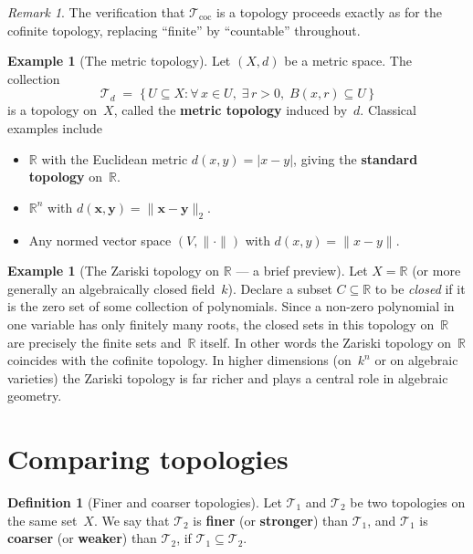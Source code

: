 \documentclass[11pt,a4paper,twoside]{book}
\theoremstyle{remark}
\newtheorem{remark}[theorem]{Remark}
\theoremstyle{definition}
\newtheorem{exampleplain}[theorem]{Example}
\theoremstyle{definition}
\newtheorem{definition}{Definition}[section]
\newcommand{\Tau}{\mathcal{T}}           %
\newcommand{\R}{\mathbb{R}}
\begin{document}
\begin{remark}
The verification that $\Tau_{\mathrm{coc}}$ is a topology proceeds exactly as
for the cofinite topology, replacing ``finite'' by ``countable'' throughout.
\end{remark}

\begin{exampleplain}[The metric topology]\label{ex:metric-topology}
Let $(X,d)$ be a metric space.  The collection
\[
  \Tau_d \;=\; \{\, U\subseteq X : \forall\, x\in U,\;\exists\, r>0,\;
                  B(x,r)\subseteq U\,\}
\]
is a topology on~$X$, called the \textbf{metric topology} induced by~$d$.
Classical examples include
\begin{itemize}
  \item $\R$ with the Euclidean metric $d(x,y)=|x-y|$, giving the
        \textbf{standard topology}\index{standard topology on $\R$} on~$\R$.
  \item $\R^n$ with $d(\mathbf{x},\mathbf{y})=\|\mathbf{x}-\mathbf{y}\|_2$.
  \item Any normed vector space $(V,\|\cdot\|)$ with $d(x,y)=\|x-y\|$.
\end{itemize}
\end{exampleplain}

\begin{exampleplain}[The Zariski topology on $\R$ --- a brief preview]
\label{ex:zariski-preview}
Let $X=\R$ (or more generally an algebraically closed field~$k$).  Declare a
subset $C\subseteq\R$ to be \emph{closed} if it is the zero set of some
collection of polynomials.  Since a non-zero polynomial in one variable has
only finitely many roots, the closed sets in this topology on~$\R$ are
precisely the finite sets and~$\R$ itself.  In other words the Zariski topology
on~$\R$ coincides with the cofinite topology.  In higher dimensions (on~$k^n$
or on algebraic varieties) the Zariski topology is far richer and plays a
central role in algebraic geometry.
\end{exampleplain}


\section{Comparing topologies}
\label{sec:comparing-topologies}

\begin{definition}[Finer and coarser topologies]\label{def:finer-coarser}
Let $\Tau_1$ and $\Tau_2$ be two topologies on the same set~$X$.  We say that
$\Tau_2$ is \textbf{finer} (or \textbf{stronger}) than $\Tau_1$, and $\Tau_1$
is \textbf{coarser} (or \textbf{weaker}) than $\Tau_2$, if
$\Tau_1\subseteq\Tau_2$.
\end{definition}
\end{document}
